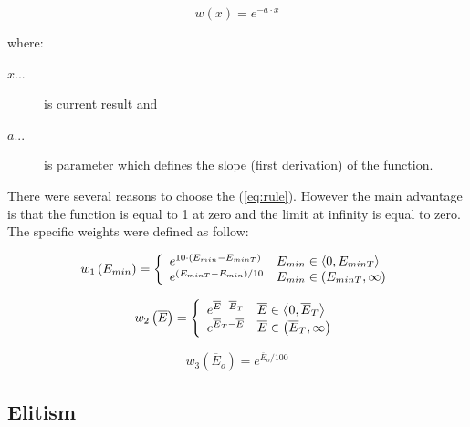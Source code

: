 \begin{equation}
w\left(x\right)= e^{-a\cdot x}
\label{eq:rule}
\end{equation}

where:
\begin{description}
\item [$x$...] is current result and
\item [$a$...] is parameter which defines the slope (first derivation) of the function.
\end{description}

There were several reasons to choose the (\ref{eq:rule}). However the main advantage is that the function is equal to 1 at zero and the limit at infinity is equal to zero. The specific weights were defined as follow:

\begin{equation}
w_1\left(E_{min}\right)= \left\{
  \begin{array}{l l}
    e^{10 \cdot (E_{min} - E_{minT})} & E_{min} \in \left\langle 0, E_{minT}\right\rangle\\
    e^{(E_{minT}-E_{min})/10} & E_{min} \in \left( E_{minT}, \infty\right)
  \end{array}\right.
\label{eq:weightEmin}
\end{equation}

\begin{equation}
w_2\left(\overline{E}\right)= \left\{
  \begin{array}{l l}
    e^{\overline{E} - \overline{E}_{T}} & \overline{E} \in \left\langle 0, \overline{E}_{T}\right\rangle\\
    e^{\overline{E}_{T} -\overline{E}} & \overline{E} \in \left( \overline{E}_{T}, \infty\right)
  \end{array}\right.
\label{eq:weightEavg}
\end{equation}

\begin{equation}
w_3\left(\overline{E}_o\right)= e^{\overline{E}_o/100}
\label{eq:weightEo}
\end{equation}

\subsection{Elitism}